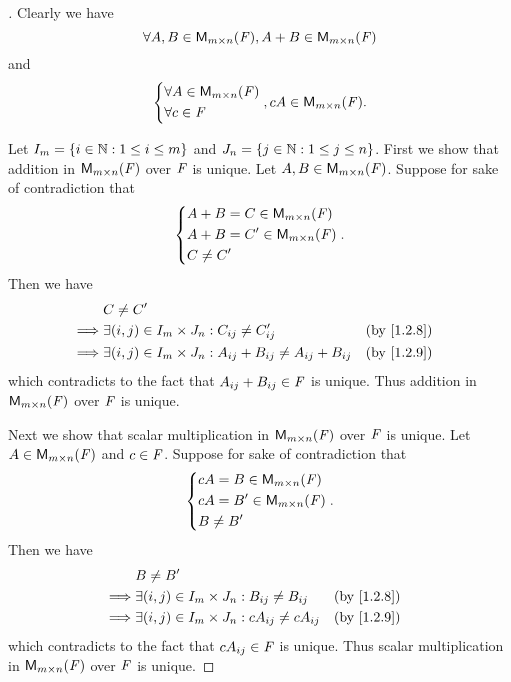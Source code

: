 \begin{proof}[]
	Clearly we have
	\[
		\forall A, B \in \mathsf{M}_{{m} \times n}({\mathit{F}}), A + B \in \mathsf{M}_{{m} \times n}({\mathit{F}})
	\]
	and
	\[
		\begin{dcases}
			\forall A \in \mathsf{M}_{{m} \times n}({\mathit{F}}) \\
			\forall c \in \mathit{F}
		\end{dcases}, cA \in \mathsf{M}_{{m} \times n}({\mathit{F}}).
	\]

	Let \(I_m = \left\lbrace i \in \mathbb{N} : 1 \leq i \leq m\right\rbrace\) and \(J_n = \left\lbrace j \in \mathbb{N} : 1 \leq j \leq n\right\rbrace\).
	First we show that addition in \(\mathsf{M}_{{m} \times n}({\mathit{F}})\) over \(\mathit{F}\) is unique.
	Let \(A, B \in \mathsf{M}_{{m} \times n}({\mathit{F}})\).
	Suppose for sake of contradiction that
	\[
		\begin{dcases}
			A + B = C \in \mathsf{M}_{{m} \times n}({\mathit{F}})  \\
			A + B = C' \in \mathsf{M}_{{m} \times n}({\mathit{F}}) \\
			C \neq C'
		\end{dcases}.
	\]
	Then we have
	\begin{align*}
		         & C \neq C'                                                                                                   \\
		\implies & \exists (i, j) \in I_m \times J_n :  C_{i j} \neq C_{i j}'                    &  & \text{(by \cref{1.2.8})} \\
		\implies & \exists (i, j) \in I_m \times J_n :  A_{i j} + B_{i j} \neq A_{i j} + B_{i j} &  & \text{(by \cref{1.2.9})}
	\end{align*}
	which contradicts to the fact that \(A_{i j} + B_{i j} \in \mathit{F}\) is unique.
	Thus addition in \(\mathsf{M}_{{m} \times n}({\mathit{F}})\) over \(\mathit{F}\) is unique.

	Next we show that scalar multiplication in \(\mathsf{M}_{{m} \times n}({\mathit{F}})\) over \(\mathit{F}\) is unique.
	Let \(A \in \mathsf{M}_{{m} \times n}({\mathit{F}})\) and \(c \in \mathit{F}\).
	Suppose for sake of contradiction that
	\[
		\begin{dcases}
			cA = B \in \mathsf{M}_{{m} \times n}({\mathit{F}})  \\
			cA = B' \in \mathsf{M}_{{m} \times n}({\mathit{F}}) \\
			B \neq B'
		\end{dcases}.
	\]
	Then we have
	\begin{align*}
		         & B \neq B'                                                                                  \\
		\implies & \exists (i, j) \in I_m \times J_n : B_{i j} \neq B_{i j}     &  & \text{(by \cref{1.2.8})} \\
		\implies & \exists (i, j) \in I_m \times J_n : c A_{i j} \neq c A_{i j} &  & \text{(by \cref{1.2.9})}
	\end{align*}
	which contradicts to the fact that \(c A_{i j} \in \mathit{F}\) is unique.
	Thus scalar multiplication in \(\mathsf{M}_{{m} \times n}({\mathit{F}})\) over \(\mathit{F}\) is unique.


\end{proof}
